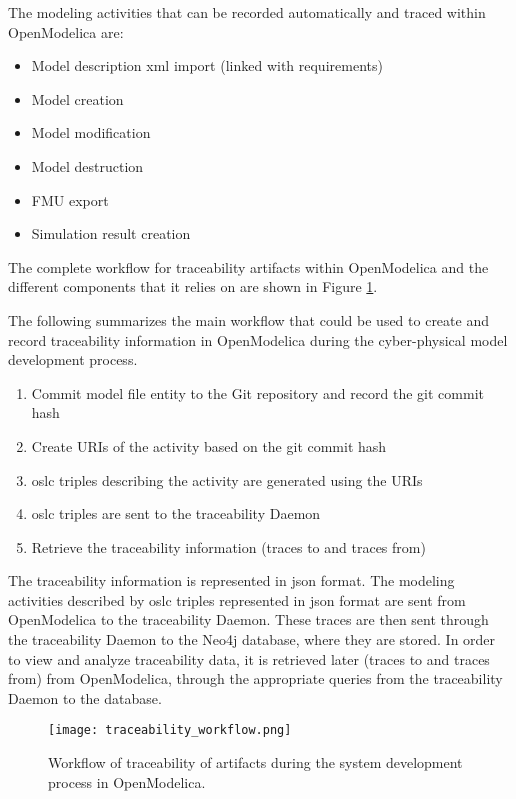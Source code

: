 The modeling activities that can be recorded automatically and traced within OpenModelica are:

\begin{itemize}
\item Model description \acrshort{xml} import (linked with requirements)
\item Model creation
\item Model modification
\item Model destruction
\item FMU export
\item Simulation result creation

\end{itemize}
The complete workflow for traceability artifacts within OpenModelica and the different components that it relies on are shown in Figure \ref{fig:traceabilityworkflow}.

The following summarizes the main workflow that could be used to create and record traceability
information in OpenModelica during the cyber-physical model development process.

\begin{enumerate}
\item Commit model file entity to the Git repository and record the git commit hash
\item Create URIs of the activity based on the git commit hash
\item \acrshort{oslc} triples describing the activity are generated using the URIs
\item \acrshort{oslc} triples are sent to the traceability Daemon
\item Retrieve the traceability information (traces to and traces from)

\end{enumerate}

The traceability information is represented in \acrshort{json} format. The modeling activities described by \acrshort{oslc}
triples represented in \acrshort{json} format are sent from OpenModelica to the traceability Daemon. These traces are then
sent through the traceability Daemon to the Neo4j database, where they are stored. In order to view and analyze
traceability data, it is retrieved later (traces to and traces from) from OpenModelica, through the
appropriate queries from the traceability Daemon to the database. 

\begin{figure}
	\texttt{[image: traceability\_workflow.png]}
	\caption{Workflow of traceability of artifacts during the system development process in OpenModelica.}
	\label{fig:traceabilityworkflow}
\end{figure}

